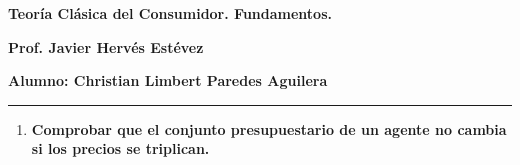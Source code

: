 \begin{center}
    \textbf{Teoría Clásica del Consumidor. Fundamentos.}
\end{center}

\begin{center}
\textbf{Prof. Javier Hervés Estévez}
\end{center}

\begin{center}
\textbf{Alumno: Christian Limbert Paredes Aguilera}
\end{center}

\begin{center}
	\rule{0.5\textwidth}{0.4pt}
\end{center}
\vspace{.8cm}

\begin{enumerate}

    \item \textbf{Comprobar que el conjunto presupuestario de un agente no cambia si los precios se triplican.}\\


\end{enumerate}
